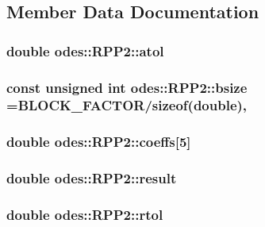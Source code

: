 \subsection{Member Data Documentation}
\hypertarget{classodes_1_1RPP2_a210e64e297a71aad445df73a24f6d3ca}{
\subsubsection[{atol}]{\setlength{\rightskip}{0pt plus 5cm}double odes\-::\-R\-P\-P2\-::atol\hspace{0.3cm}{\ttfamily [private]}}}\label{classodes_1_1RPP2_a210e64e297a71aad445df73a24f6d3ca}
\hypertarget{classodes_1_1RPP2_a179acb63d58032d8ba8554705abcbc8c}{
\subsubsection[{bsize}]{\setlength{\rightskip}{0pt plus 5cm}const unsigned int odes\-::\-R\-P\-P2\-::bsize ={\bf B\-L\-O\-C\-K\-\_\-\-F\-A\-C\-T\-O\-R}/sizeof(double)\hspace{0.3cm}{\ttfamily [static]}, {\ttfamily [private]}}}\label{classodes_1_1RPP2_a179acb63d58032d8ba8554705abcbc8c}
\hypertarget{classodes_1_1RPP2_afa694ed8ed7856b02bfba9d769fbe23a}{
\subsubsection[{coeffs}]{\setlength{\rightskip}{0pt plus 5cm}double odes\-::\-R\-P\-P2\-::coeffs\mbox{[}5\mbox{]}\hspace{0.3cm}{\ttfamily [private]}}}\label{classodes_1_1RPP2_afa694ed8ed7856b02bfba9d769fbe23a}
\hypertarget{classodes_1_1RPP2_ad5a579b372d17ea03835dae006cc755e}{
\subsubsection[{result}]{\setlength{\rightskip}{0pt plus 5cm}double odes\-::\-R\-P\-P2\-::result}}\label{classodes_1_1RPP2_ad5a579b372d17ea03835dae006cc755e}
\hypertarget{classodes_1_1RPP2_ad264a1accdc065b7553cc79366af2579}{
\subsubsection[{rtol}]{\setlength{\rightskip}{0pt plus 5cm}double odes\-::\-R\-P\-P2\-::rtol\hspace{0.3cm}{\ttfamily [private]}}}\label{classodes_1_1RPP2_ad264a1accdc065b7553cc79366af2579}
